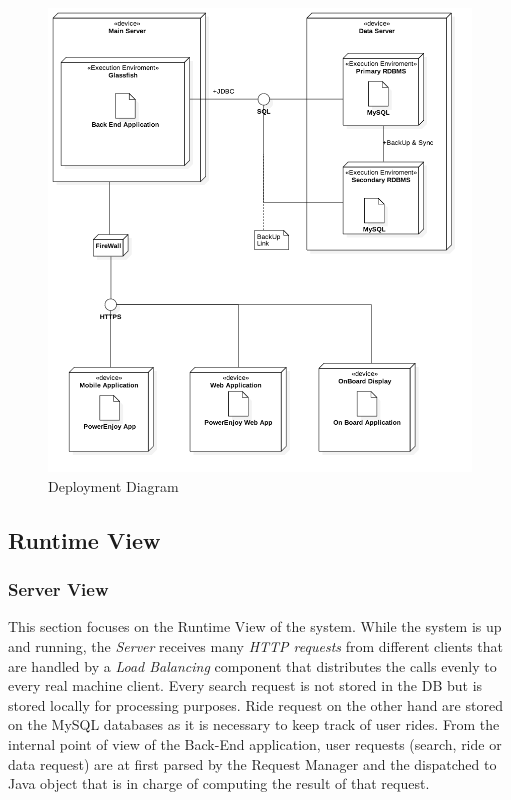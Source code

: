\FloatBarrier
\begin{figure}
\centering
\hspace{-5mm}
\includegraphics[scale=0.38]{Images/DeployDiagram/Deploy3.png}
\caption{Deployment Diagram}
\end{figure}
\FloatBarrier


\subsection{Runtime View}
\subsubsection{Server View}
This section focuses on the Runtime View of the system.
While the system is up and running, the \emph{Server} receives many \emph{HTTP requests}
from different clients that are handled by a \emph{Load Balancing} component that
distributes the calls evenly to every real machine client.
Every search request is not stored in the DB but is stored locally for processing purposes. Ride request on the other hand are stored on the MySQL databases as it is necessary to keep track of user rides. 
From the internal point of view of the Back-End application, user requests (search, ride or data request) are at first parsed by the Request Manager and the dispatched to Java object that is in charge of computing the result of that request.
